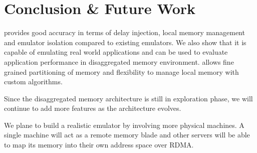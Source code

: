 
\chapter{Conclusion \& Future Work}

{\dime} provides good accuracy in terms of delay injection, local memory management and emulator isolation compared to existing emulators. We also show that it is capable of emulating real world applications and can be used to evaluate application performance in disaggregated memory environment. {\dime} allows fine grained partitioning of memory and flexibility to manage local memory with custom algorithms.

Since the disaggregated memory architecture is still in exploration phase, we will continue to add more features as the architecture evolves.

We plane to build a realistic emulator by involving more physical machines. A single machine will act as a remote memory blade and other servers will be able to map its memory into their own address space over RDMA.
